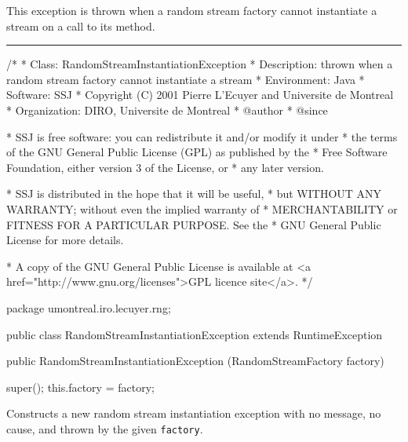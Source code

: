 
This exception is thrown when a random stream factory cannot instantiate a stream
on a call to its  method.

\bigskip\hrule

\begin{code}
\begin{hide}
/*
 * Class:        RandomStreamInstantiationException
 * Description:  thrown when a random stream factory cannot instantiate a stream
 * Environment:  Java
 * Software:     SSJ 
 * Copyright (C) 2001  Pierre L'Ecuyer and Universite de Montreal
 * Organization: DIRO, Universite de Montreal
 * @author       
 * @since

 * SSJ is free software: you can redistribute it and/or modify it under
 * the terms of the GNU General Public License (GPL) as published by the
 * Free Software Foundation, either version 3 of the License, or
 * any later version.

 * SSJ is distributed in the hope that it will be useful,
 * but WITHOUT ANY WARRANTY; without even the implied warranty of
 * MERCHANTABILITY or FITNESS FOR A PARTICULAR PURPOSE.  See the
 * GNU General Public License for more details.

 * A copy of the GNU General Public License is available at
   <a href="http://www.gnu.org/licenses">GPL licence site</a>.
 */
\end{hide}
package umontreal.iro.lecuyer.rng;

public class RandomStreamInstantiationException extends RuntimeException\begin{hide} {
   private RandomStreamFactory factory;
\end{hide}

   public RandomStreamInstantiationException (RandomStreamFactory factory)\begin{hide} {
      super();
      this.factory = factory;
   }\end{hide}
\end{code}
\begin{tabb}   Constructs a new random stream instantiation exception with
 no message, no cause, and thrown by the given \texttt{factory}.
\end{tabb}
\begin{htmlonly}
\end{htmlonly}
